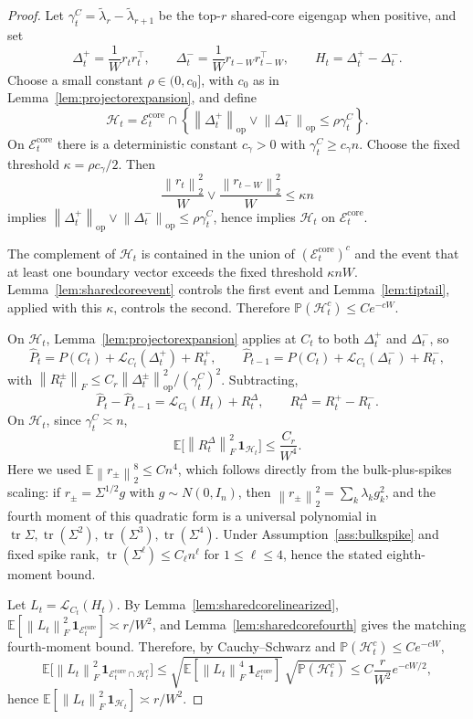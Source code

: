 \documentclass[11pt]{article}
\theoremstyle{tightplain}
\theoremstyle{tightdef}
\DeclareMathOperator{\tr}{tr}
\DeclareMathOperator{\op}{op}
\newcommand{\E}{\mathbb E}
\newcommand{\Prob}{\mathbb P}
\newcommand{\norm}[1]{\left\lVert #1 \right\rVert}
\newcommand{\one}{\mathbf 1}
\begin{document}
\begin{proof}
Let $\gamma_t^C=\widetilde\lambda_r-\widetilde\lambda_{r+1}$ be the top-$r$
shared-core eigengap when positive, and set
\[
\Delta_t^+=\frac1W r_t r_t^\top,
\qquad
\Delta_t^-=\frac1W r_{t-W} r_{t-W}^\top,
\qquad
H_t=\Delta_t^+-\Delta_t^-.
\]
Choose a small constant $\rho\in(0,c_0]$, with $c_0$ as in
Lemma~\ref{lem:projectorexpansion}, and define
\[
\mathcal H_t
=\mathcal E_t^{\mathrm{core}}
\cap
\left\{
\norm{\Delta_t^+}_{\op}\vee\norm{\Delta_t^-}_{\op}
\le
\rho\gamma_t^C
\right\}.
\]
On $\mathcal E_t^{\mathrm{core}}$ there is a deterministic constant $c_\gamma>0$
with $\gamma_t^C\ge c_\gamma n$. Choose the fixed threshold
$\kappa=\rho c_\gamma/2$. Then
\[
\frac{\norm{r_t}_2^2}{W}
\vee
\frac{\norm{r_{t-W}}_2^2}{W}
\le
\kappa n
\]
implies $\norm{\Delta_t^+}_{\op}\vee\norm{\Delta_t^-}_{\op}\le\rho\gamma_t^C$,
hence implies $\mathcal H_t$ on $\mathcal E_t^{\mathrm{core}}$.

The complement of $\mathcal H_t$ is contained in the union of
$(\mathcal E_t^{\mathrm{core}})^c$ and the event that at least one boundary
vector exceeds the fixed threshold $\kappa nW$.
Lemma~\ref{lem:sharedcoreevent} controls the first event and
Lemma~\ref{lem:tiptail}, applied with this $\kappa$, controls the second.
Therefore $\Prob(\mathcal H_t^c)\le Ce^{-cW}$.

On $\mathcal H_t$, Lemma~\ref{lem:projectorexpansion} applies at $C_t$ to both
$\Delta_t^+$ and $\Delta_t^-$, so
\[
\widehat P_t
=P(C_t)+\mathcal L_{C_t}(\Delta_t^+)+R_t^+,
\qquad
\widehat P_{t-1}
=P(C_t)+\mathcal L_{C_t}(\Delta_t^-)+R_t^-,
\]
with $\norm{R_t^\pm}_F\le C_r\norm{\Delta_t^\pm}_{\op}^2/(\gamma_t^C)^2$.
Subtracting,
\[
\widehat P_t-\widehat P_{t-1}
=\mathcal L_{C_t}(H_t)+R_t^\Delta,
\qquad
R_t^\Delta=R_t^+-R_t^-.
\]
On $\mathcal H_t$, since $\gamma_t^C\asymp n$,
\[
\E\bigl[\norm{R_t^\Delta}_F^2\,\one_{\mathcal H_t}\bigr]\le \frac{C_r}{W^4}.
\]
Here we used $\E\norm{r_\pm}_2^8\le Cn^4$, which follows directly from the
bulk-plus-spikes scaling: if $r_\pm=\Sigma^{1/2}g$ with $g\sim N(0,I_n)$, then
$\norm{r_\pm}_2^2=\sum_k\lambda_k g_k^2$, and the fourth moment of this
quadratic form is a universal polynomial in
$\tr\Sigma,\tr(\Sigma^2),\tr(\Sigma^3),\tr(\Sigma^4)$. Under
Assumption~\ref{ass:bulkspike} and fixed spike rank,
$\tr(\Sigma^\ell)\le C_\ell n^\ell$ for $1\le \ell\le4$, hence the stated
eighth-moment bound.

Let $L_t=\mathcal L_{C_t}(H_t)$. By Lemma~\ref{lem:sharedcorelinearized},
$\E[\norm{L_t}_F^2\,\one_{\mathcal E_t^{\mathrm{core}}}]\asymp r/W^2$, and
Lemma~\ref{lem:sharedcorefourth} gives the matching fourth-moment bound.
Therefore, by Cauchy--Schwarz and $\Prob(\mathcal H_t^c)\le Ce^{-cW}$,
\[
\E\bigl[
\norm{L_t}_F^2
\,\one_{\mathcal E_t^{\mathrm{core}}\cap \mathcal H_t^c}
\bigr]
\le
\sqrt{\E[\norm{L_t}_F^4\,\one_{\mathcal E_t^{\mathrm{core}}}]}\,\sqrt{\Prob(\mathcal H_t^c)}
\le
C\frac r{W^2}e^{-cW/2},
\]
hence $\E[\norm{L_t}_F^2\,\one_{\mathcal H_t}]\asymp r/W^2$.


\end{proof}
\end{document}
